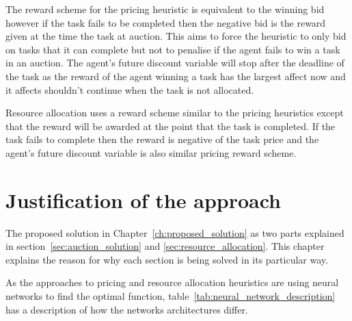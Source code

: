 The reward scheme for the pricing heuristic is equivalent to the winning bid however if the task fails to be completed
then the negative bid is the reward given at the time the task at auction. This aims
to force the heuristic to only bid on tasks that it can complete but not to penalise if the agent fails to win a task
in an auction. The agent's future discount variable will stop after the deadline of the task as the reward of the agent
winning a task has the largest affect now and it affects shouldn't continue when the task is not allocated.

Resource allocation uses a reward scheme similar to the pricing heuristics except that the reward will be awarded at the
point that the task is completed. If the task fails to complete then the reward is negative of the task price and the
agent's future discount variable is also similar pricing reward scheme.

\chapter{Justification of the approach}\label{ch:justification-of-the-approach}
The proposed solution in Chapter~\ref{ch:proposed_solution} as two parts explained in section~\ref{sec:auction_solution} and
\ref{sec:resource_allocation}. This chapter explains the reason for why each section is being solved in its particular way.

As the approaches to pricing and resource allocation heuristics are using neural networks to find the optimal function,
table~\ref{tab:neural_network_description} has a description of how the networks architectures differ.

